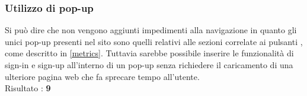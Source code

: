 \subsubsection{Utilizzo di pop-up}
Si può dire che non vengono aggiunti
impedimenti alla navigazione in quanto gli 
unici pop-up presenti nel sito sono quelli relativi alle sezioni 
correlate ai pulsanti , come descritto in
\ref{metrics}. Tuttavia sarebbe possibile inserire le funzionalità di
sign-in e sign-up all'interno di un pop-up senza richiedere il caricamento
di una ulteriore pagina web che fa sprecare tempo all'utente. \\
Risultato : \textbf{9}
